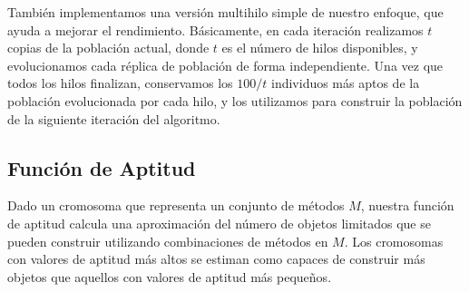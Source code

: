 También implementamos una versión multihilo simple de nuestro enfoque, 
que ayuda a mejorar el rendimiento. 
Básicamente, en cada iteración realizamos $t$ copias de la población actual, 
donde $t$ es el número de hilos disponibles, 
y evolucionamos cada réplica de población de forma independiente. 
Una vez que todos los hilos finalizan, conservamos los $100/t$ individuos más aptos de la población evolucionada por cada hilo, 
y los utilizamos para construir la población de la siguiente iteración del algoritmo.



\subsection{Función de Aptitud}

Dado un cromosoma que representa un conjunto de métodos $M$,
nuestra función de aptitud calcula una aproximación del número de objetos limitados que se pueden construir utilizando 
combinaciones de métodos en $M$. Los cromosomas con valores de aptitud más altos se estiman 
como capaces de construir más objetos que aquellos con valores de aptitud más pequeños.

